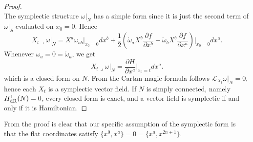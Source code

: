 \documentclass{article}
\numberwithin{equation}{section}
\theoremstyle{definition}
\newcommand{\inn}{\operatorname{\lrcorner}}
\newcommand{\pder}[2]{\frac{\partial #1}{\partial #2}}
\begin{document}
\begin{proof}
\begin{equation}
    \end{equation}
    The symplectic structure $\omega|_N$ has a simple form since it is just the second term of $\omega|_S$ evaluated on $x_0=0$. Hence
    \begin{equation}
        X_t\inn\omega|_N=X^a\omega_{ab}\big|_{x_0=0}dx^b+\frac{1}{2}\left(\mathring{\omega}_aX^b\pder{f}{x^b}-\mathring{\omega}_bX^b\pder{f}{x^a}\right)\bigg|_{x_0=0}dx^a.
    \end{equation}
    Whenever $\omega_a=0=\mathring{\omega}_a$, we get
    \begin{equation}
         X_t\inn\omega|_N=\pder{H}{x^a}\bigg|_{x_0=t}dx^a.
    \end{equation}
    which is a closed form on $N$. From the Cartan magic formula follows $\mathcal{L}_{X_t}\omega|_N=0$, hence each $X_t$ is a symplectic vector field. If $N$ is simply connected, namely $H_{\rm dR}^1(N)=0$, every closed form is exact, and a vector field is symplectic if and only if it is Hamiltonian.    
\end{proof}
From the proof is clear that our specific assumption of the symplectic form is that the flat coordinates satisfy $\{x^0,x^a\}=0=\{x^a,x^{2n+1}\}$.
\end{document}
